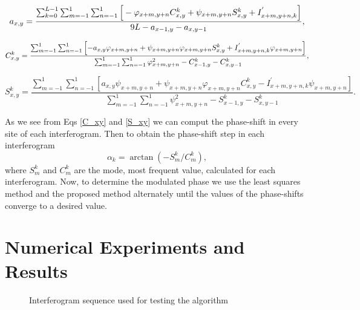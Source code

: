 \documentclass[letterpaper,12pt]{article}   %
\begin{document}
\begin{equation}
	a_{x,y} = \frac{ \sum_{k=0}^{L-1} \sum_{m=-1}^{1} \sum_{n=-1}^{1} \left[\\ 																	-\varphi_{x+m,y+n}C_{x,y}^k+\psi_{x+m,y+n}S_{x,y}^k+I_{x+m,y+n,k}^{'} \right] } { 9L - a_{x-1,y}-a_{x,y-1}},
\end{equation}

\begin{equation}\label{C_xy}
	C_{x,y}^k = \frac{ \sum_{m=-1}^{1} \sum_{n=-1}^{1} \left[ -a_{x,y} \varphi_{x+m,y+n}+ \psi_{x+m,y+n} \varphi_{x+m,y+n} S_{x,y}^k +\\ 		I_{x+m,y+n,k}^{'} \varphi_{x+m,y+n} \right] } { \sum_{m=-1}^{1} \sum_{n=-1}^{1} \varphi_{x+m,y+n}^2 -C_{x-1,y}^k-C_{x,y-1}^k },
\end{equation}

\begin{equation}\label{S_xy}
	S_{x,y}^k = \frac{ \sum_{m=-1}^{1} \sum_{n=-1}^{1} \left[ a_{x,y} \psi_{x+m,y+n} + \psi_{x+m,y+n} \varphi_{x+m,y+n} C_{x,y}^k - 			I_{x+m,y+n,k}^{'} \psi_{x+m,y+n} \right] } { \sum_{m=-1}^{1} \sum_{n=-1}^{1} \psi_{x+m,y+n}^2 - S_{x-1,y}^k - S_{x,y-1}^k }.
\end{equation}

As we see from Eqs \ref{C_xy} and \ref{S_xy} we can comput the phase-shift in every site of each interferogram. Then to obtain the phase-shift step in each interferogram
\begin{equation}
	\alpha_k = \arctan(-S_m^k/C_m^k),
\end{equation}
where $S_m^k$ and $C_m^k$ are the mode, most frequent value, calculated for each interferogram.
Now, to determine the modulated phase we use the least squares method and the proposed method alternately until the values ​​of the phase-shifts converge to a desired value.


\section{Numerical Experiments and Results}

\begin{figure}[t]
	\begin{center}
	\end{center}
	\caption{Interferogram sequence used for testing the algorithm} 
	\label{fig:Interferograms}
\end{figure}
\end{document}
